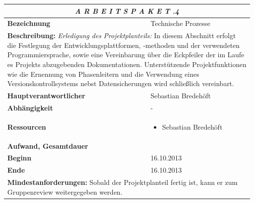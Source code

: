 \documentclass[fontsize=12pt,paper=a4,twoside]{scrartcl}
\begin{document}
\begin{tabular}{p{7.5cm}|p{7.5cm}}\toprule
\multicolumn{2}{c}{\textbf{\textit{A R B E I T S P A K E T \quad 1.1.4}}} \\ \toprule \hline
\textbf{Bezeichnung} & Technische Prozesse\\\hline
\multicolumn{2}{p{15cm}}{\textbf{Beschreibung:} \newline 
\textit{Erledigung des Projektplanteils:} In diesem Abschnitt erfolgt die Festlegung der Entwicklungsplattformen, -methoden und der verwendeten Programmiersprache, sowie eine Vereinbarung über die Eckpfeiler der im Laufe es Projekts abzugebenden Dokumentationen. Unterstützende Projektfunktionen wie die Ernennung von Phasenleitern und die Verwendung eines Versionskontrollsystems nebst Datensicherungen wird schließlich vereinbart. }  \\\hline
\textbf{Hauptverantwortlicher} & Sebastian Bredehöft \\\hline
\textbf{Abhängigkeit} & -\\\hline
\textbf{Ressourcen} & \begin{itemize}
\itemsep0pt
\item Sebastian Bredehöft
\end{itemize} \\\hline
\textbf{Aufwand, Gesamtdauer} & \\\hline
\textbf{Beginn} & 16.10.2013 \\\hline
\textbf{Ende} & 16.10.2013\\\hline
\multicolumn{2}{p{15cm}}{\textbf{Mindestanforderungen: } \newline
Sobald der Projektplanteil fertig ist, kann er zum Gruppenreview weitergegeben werden. }  \\ \toprule
\end{tabular} \\\\
\end{document}
